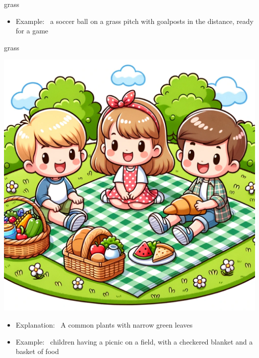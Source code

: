 \documentclass[avery5371, grid,frame]{flashcards}
\begin{document}
\begin{flashcard}{grass}
\begin{center}
\begin{minipage}[c]{.45\textwidth}
\begin{itemize}
            \item Example: \ a soccer ball on a grass pitch with goalposts in the distance, ready for a game
            \end{itemize}
        \end{minipage}
    \end{center}
    \vspace*{\fill}
\end{flashcard}\begin{flashcard}{grass}
    \vspace*{\fill}
    \begin{center}
        \begin{minipage}[c]{.45\textwidth}
            \includegraphics[width=\textwidth]{cards/g/grass/grass - children having a picnic on a field, with a checkered blanket and a basket of food.png}
        \end{minipage}
        \begin{minipage}[c]{.45\textwidth}
            \begin{itemize}\setlength\itemsep{12pt}
            \item Explanation: \ A common plants with narrow green leaves

            \item Example: \ children having a picnic on a field, with a checkered blanket and a basket of food
            \end{itemize}
        \end{minipage}
    \end{center}
    \vspace*{\fill}
\end{flashcard}
\end{document}
